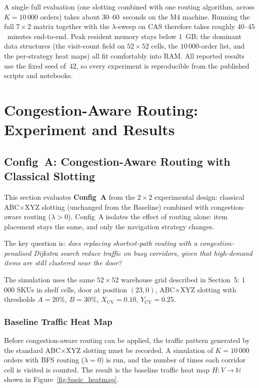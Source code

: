 \documentclass[12pt,a4paper]{article}
\begin{document}
A single full evaluation (one slotting combined with one routing algorithm,
across $K = 10\,000$ orders) takes about $30$--$60$~seconds on the M4
machine. Running the full $7 \times 2$ matrix together with the
$\lambda$-sweep on CAS therefore takes roughly $40$--$45$~minutes
end-to-end. Peak resident memory stays below $1$~GB; the dominant
data structures (the visit-count field on $52 \times 52$ cells, the
$10\,000$-order list, and the per-strategy heat maps) all fit
comfortably into RAM. All reported results use the fixed seed of~$42$,
so every experiment is reproducible from the published scripts and
notebooks.

\section{Congestion-Aware Routing: Experiment and Results}

\subsection{Config~A: Congestion-Aware Routing with Classical Slotting}

This section evaluates \textbf{Config~A} from the $2 \times 2$ experimental design:
classical ABC$\times$XYZ slotting (unchanged from the Baseline) combined with
congestion-aware routing ($\lambda > 0$). Config~A isolates the effect of routing
alone: item placement stays the same, and only the navigation strategy changes.

The key question is: \emph{does replacing shortest-path routing with a
congestion-penalised Dijkstra search reduce traffic on busy corridors, given that
high-demand items are still clustered near the door?}

The simulation uses the same $52 \times 52$ warehouse grid described in Section~5:
1\,000 SKUs in shelf cells, door at position $(23, 0)$, ABC$\times$XYZ slotting
with thresholds $A = 20\%$, $B = 30\%$, $X_{\mathrm{CV}} = 0.10$,
$Y_{\mathrm{CV}} = 0.25$.

\subsubsection{Baseline Traffic Heat Map}
\label{sec:configA_heatmap}

Before congestion-aware routing can be applied, the traffic pattern generated
by the standard ABC$\times$XYZ slotting must be recorded. A simulation of
$K = 10\,000$ orders with BFS routing ($\lambda = 0$) is run, and the number of
times each corridor cell is visited is counted. The result is the baseline traffic
heat map $H : V \to \mathbb{N}$ shown in Figure~\ref{fig:basic_heatmap}.
\end{document}
